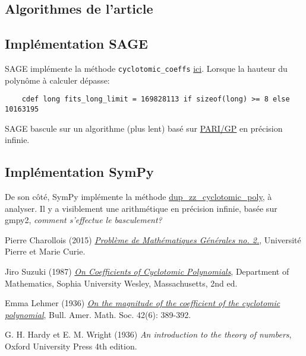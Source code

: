 \documentclass{article}
\theoremstyle{break}                  %
\begin{document}
\subsection*{Algorithmes de l'article}

\subsection*{Implémentation SAGE}
SAGE implémente la méthode  \texttt{cyclotomic\_coeffs} \href{https://github.com/sagemath/sage/blob/develop/src/sage/rings/polynomial/cyclotomic.pyx}{ici}. Lorsque la hauteur du polynôme à calculer dépasse:
\begin{verbatim}
	cdef long fits_long_limit = 169828113 if sizeof(long) >= 8 else 10163195
\end{verbatim}
SAGE bascule sur un algorithme (plus lent) basé sur \href{https://pari.math.u-bordeaux.fr/}{PARI/GP} en précision infinie.

\subsection*{Implémentation SymPy}
De son côté, SymPy implémente la méthode \href{https://docs.sympy.org/latest/modules/polys/internals.html#sympy.polys.factortools.dup_zz_cyclotomic_poly}{dup\_zz\_cyclotomic\_poly}, à analyser. Il y a visiblement une arithmétique en précision infinie, basée sur gmpy2, \textit{comment s'effectue le basculement?}

\begin{thebibliography}{9}
	Pierre Charollois (2015) \href{https://webusers.imj-prg.fr/~pierre.charollois/Charollois_Pbme_cyclotomiques_agreg2015.pdf}{\emph{Problème de Mathématiques Générales no. 2.}}, Université Pierre et Marie Curie.
	
	Jiro Suzuki (1987) \href{https://projecteuclid.org/journals/proceedings-of-the-japan-academy-series-a-mathematical-sciences/volume-63/issue-7/On-coefficients-of-cyclotomic-polynomials/10.3792/pjaa.63.279.full}{\emph{On Coefficients of Cyclotomic Polynomials}}, Department of Mathematics, Sophia University
	Wesley, Massachusetts, 2nd ed.
	
	Emma Lehmer (1936) \href{https://projecteuclid.org/journals/bulletin-of-the-american-mathematical-society-new-series/volume-42/issue-6/On-the-magnitude-of-the-coefficients-of-the-cyclotomic-polynomial/bams/1183498920.full}{\emph{On the magnitude of the coefficient of the cyclotomic polynomial}}, Bull. Amer. Math. Soc. 42(6): 389-392.
	
	G. H. Hardy et E. M. Wright (1936)
	\emph{An introduction to the theory of numbers}, Oxford University Press 4th edition.
\end{thebibliography}
\end{document}
